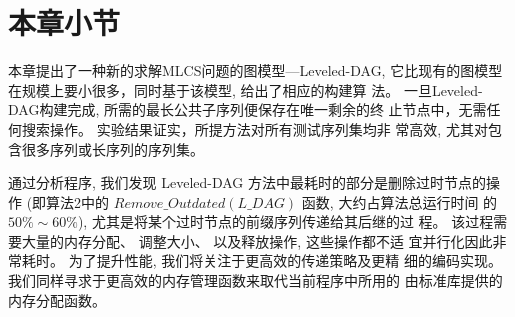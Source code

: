 \section{本章小节}
\label{sec:4_conculsion}

本章提出了一种新的求解MLCS问题的图模型---Leveled-DAG, 它比现有的图模型
在规模上要小很多，同时基于该模型, 给出了相应的构建算
法。 一旦Leveled-DAG构建完成, 所需的最长公共子序列便保存在唯一剩余的终
止节点中，无需任何搜索操作。 实验结果证实，所提方法对所有测试序列集均非
常高效, 尤其对包含很多序列或长序列的序列集。

通过分析程序, 我们发现 Leveled-DAG 方法中最耗时的部分是删除过时节点的操
作 (即算法2中的 $Remove\_Outdated(L\_DAG)$ 函数, 大约占算法总运行时间
的 $50\% \sim 60\%$), 尤其是将某个过时节点的前缀序列传递给其后继的过
程。 该过程需要大量的内存分配、 调整大小、 以及释放操作, 这些操作都不适
宜并行化因此非常耗时。 为了提升性能, 我们将关注于更高效的传递策略及更精
细的编码实现。 我们同样寻求于更高效的内存管理函数来取代当前程序中所用的
由标准库提供的内存分配函数。



